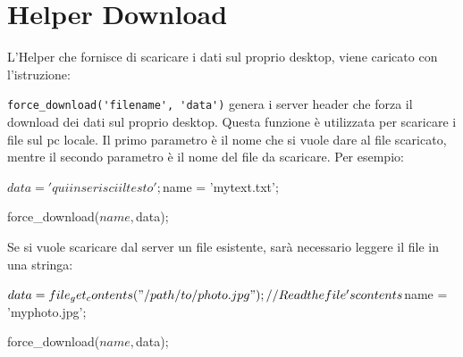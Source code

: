 \section{Helper Download}
\label{helper:download}
L'Helper che fornisce di scaricare i dati sul proprio desktop, viene caricato con l'istruzione:


\verb|force_download('filename', 'data')| genera i server header che forza il download dei dati sul proprio desktop. Questa funzione è utilizzata per scaricare i file sul pc locale. Il primo parametro è il nome che si vuole dare al file scaricato, mentre il secondo parametro è il nome del file da scaricare. Per esempio:

\begin{code}
$data = 'qui inserisci il testo';
$name = 'mytext.txt';

force_download($name, $data);
\end{code}

Se si vuole scaricare dal server un file esistente, sarà necessario leggere il file in una stringa:

\begin{code}
$data = file_get_contents("/path/to/photo.jpg"); // Read the file's contents
$name = 'myphoto.jpg';

force_download($name, $data);
\end{code}